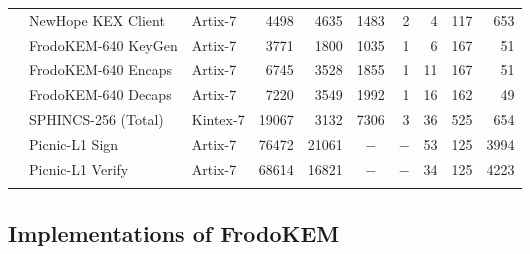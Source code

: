 \begin{table*}[tbhp]
\begin{center}
{\begin{tabular}{c l l N{5}{0} N{5}{0} N{5}{0} N{3}{0} N{3}{0} N{3}{0} N{5}{0}}
& \textsf{NewHope} KEX Client \cite{oder2017implementing}  & Artix-7   & 4498 & 4635 & 1483 & 2 & 4 & 117 & 653 \\  \Tstrut
& \textsf{FrodoKEM}-640 KeyGen \cite{howe2018standard} & Artix-7 & 3771 & 1800 & 1035 & 1 & 6 & 167 & 51 \\
& \textsf{FrodoKEM}-640 Encaps \cite{howe2018standard}  & Artix-7 & 6745 & 3528 & 1855 & 1 & 11 & 167 & 51 \\
& \textsf{FrodoKEM}-640 Decaps \cite{howe2018standard}  & Artix-7 & 7220 & 3549 & 1992 & 1 & 16 & 162 & 49 \\ \hline \Tstrut \Tstrut
\parbox[t]{5mm}{} & \textsf{SPHINCS-256} (Total) \cite{amiet2018fpga} & Kintex-7 & 19067 & 3132 & 7306 & 3 & 36 & 525 & 654 \\ \hline 	\Tstrut
 \parbox[t]{5mm}{} & \textsf{Picnic}-L1 Sign \cite{kales2020efficient} & Artix-7 & 76472 & 21061 &  &  & 53 & 125 & 3994 \\
& \textsf{Picnic}-L1 Verify \cite{kales2020efficient} & Artix-7 & 68614 & 16821 &  &  & 34 & 125 & 4223 \\
\hline \Bstrut
\end{tabular}}%
\end{center}
\end{table*}

\subsection{Implementations of FrodoKEM}

